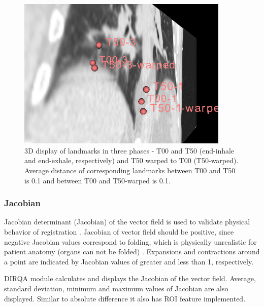 \documentclass[type=dr, dr=rernat, accentcolor=tud7b,colorbacktitle, bigchapter, openright, twoside, 12pt ]{tudthesis}
\begin{document}
\begin{figure}[H]
\begin{center}
\includegraphics[width=0.9\textwidth]{./Images/landmark.png}
\caption{3D display of landmarks in three phases - T00 and T50 (end-inhale and end-exhale, respectively) and T50 warped to T00 (T50-warped). Average distance of corresponding landmarks between T00 and T50 is 0.1 and between T00 and T50-warped is 0.1.}
\label{inv}
\end{center}
\end{figure}


\subsubsection{Jacobian}
\label{Jacobian}

Jacobian determinant (Jacobian) of the vector field is used to validate physical behavior of registration \cite{Leow2007}. Jacobian of vector field should be positive, since negative Jacobian values correspond to folding, which is physically unrealistic for patient anatomy (organs can not be folded) \cite{Chen2008, Rey2002}. Expansions and contractions around a point are indicated by Jacobian values of greater and less than 1, respectively. 

DIRQA module calculates and displays the Jacobian of the vector field. Average, standard deviation, minimum and maximum values of Jacobian are also displayed. Similar to absolute difference it also has ROI feature implemented.
\end{document}
